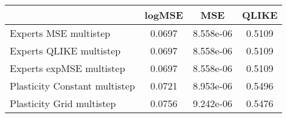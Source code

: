 
\begin{tabular}{l|c|c|c}
    & logMSE & MSE & QLIKE \\\hline
Experts MSE multistep & 0.0697 & 8.558e-06 & 0.5109\\ 
Experts QLIKE multistep & 0.0697 & 8.558e-06 & 0.5109\\ 
Experts expMSE multistep & 0.0697 & 8.558e-06 & 0.5109\\ 
Plasticity Constant multistep & 0.0721 & 8.953e-06 & 0.5496\\ 
Plasticity Grid multistep & 0.0756 & 9.242e-06 & 0.5476\\ 
\end{tabular}